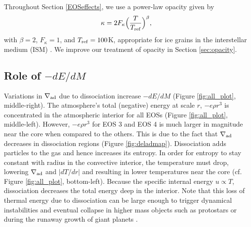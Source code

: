 

Throughout Section \ref{EOSeffects}, we use a power-law opacity given by
\begin{equation}
\label{eq:opacitylaw}
\kappa=2 F_{\kappa} \Big(\frac{T}{T_{\rm ref}}\Big)^{\beta},
\end{equation}  
\noindent with $\beta =2$, $F_{\kappa} = 1$, and $T_{\rm{ref}}=100$K, appropriate for ice grains in the interstellar medium (ISM) \citep{bell94}.  We improve our treatment of opacity in Section \ref{sec:opacity}.




\subsection{Role of $-dE/dM$}\label{sec:dEdM}

Variations in $\nabla_{\rm ad}$ due to dissociation increase $-dE/dM$ (Figure \ref{fig:all_plot}, middle-right). 
The atmosphere's total (negative) energy at scale $r$, $-e \rho r^3$ 
is concentrated in the atmospheric interior for all EOSs (Figure \ref{fig:all_plot}, middle-left). However, $-e \rho r^3$ for EOS 3 and EOS 4 is much larger in magnitude near the core when compared to the others. This is due to the fact that $\nabla_{\rm ad}$ decreases in dissociation regions (Figure \ref{fig:deladmap}). Dissociation adds particles to the gas and hence increases its entropy. In order for entropy to stay constant with radius in the convective interior, the temperature must drop, lowering $\nabla_{\rm ad}$ and $|dT/dr|$ and resulting in lower temperatures near the core (cf. Figure \ref{fig:all_plot}, bottom-left). Because  the specific internal energy $u \propto T$, dissociation decreases the total energy deep in the interior.  Note that this loss of thermal energy due to dissociation can be large enough to trigger dynamical instabilities and eventual collapse in higher mass objects such as protostars \citep{larson69} or during the runaway growth of giant planets \citep{bodenheimer80}.  



